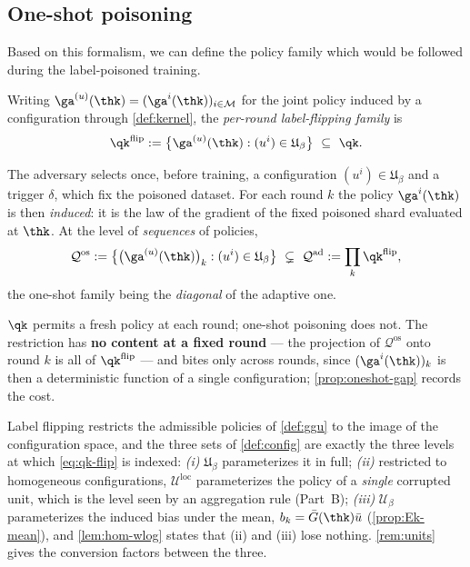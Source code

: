 \subsection{One-shot poisoning}
\label{sec:oneshot}

Based on this formalism, we can define the policy family which would be followed during the
label-poisoned training.

\begin{definition}
\label{def:qk-flip}
Writing $\ga^{(u)}(\thk)=(\ga^{i}(\thk))_{i\in\mathcal{M}}$ for the joint policy induced by a
configuration through \cref{def:kernel}, the \emph{per-round label-flipping family} is
\begin{equation}
\qk^{\mathrm{flip}}:=\big\{\ga^{(u)}(\thk):(u^i)\in\mathfrak{U}_\beta\big\}\ \subseteq\ \qk .
\label{eq:qk-flip}
\end{equation}
\end{definition}

\begin{definition}
\label{def:induced}
The adversary selects once, before training, a configuration $(u^i)\in\mathfrak{U}_\beta$ and a
trigger $\delta$, which fix the poisoned dataset. For each round $k$ the policy $\ga^i(\thk)$ is
then \emph{induced}: it is the law of the gradient of the fixed poisoned shard evaluated at
$\thk$. At the level of \emph{sequences} of policies,
\begin{equation}
\mathcal{Q}^{\mathrm{os}}:=\big\{\big(\ga^{(u)}(\thk)\big)_{k}:(u^i)\in\mathfrak{U}_\beta\big\}
\ \subsetneq\
\mathcal{Q}^{\mathrm{ad}}:=\prod_k\qk^{\mathrm{flip}} ,
\end{equation}
the one-shot family being the \emph{diagonal} of the adaptive one.
\end{definition}

$\qk$ permits a fresh policy at each round; one-shot poisoning does not. The restriction has
\textbf{no content at a fixed round} --- the projection of $\mathcal{Q}^{\mathrm{os}}$ onto round
$k$ is all of $\qk^{\mathrm{flip}}$ --- and bites only across rounds, since $(\ga^i(\thk))_k$ is
then a deterministic function of a single configuration; \cref{prop:oneshot-gap} records the
cost.

\begin{remark}
\label{rem:qk-param}
Label flipping restricts the admissible policies of \cref{def:ggu} to the image of the
configuration space, and the three sets of \cref{def:config} are exactly the three levels at
which \cref{eq:qk-flip} is indexed: \emph{(i)} $\mathfrak{U}_\beta$ parameterizes it in full;
\emph{(ii)} restricted to homogeneous configurations, $\mathcal{U}^{\mathrm{loc}}$ parameterizes
the policy of a \emph{single} corrupted unit, which is the level seen by an aggregation rule
(Part~B); \emph{(iii)} $\mathcal{U}_\beta$ parameterizes the induced bias under the mean,
$b_k=\bar G(\thk)\bar u$ (\cref{prop:Ek-mean}), and \cref{lem:hom-wlog} states that (ii) and
(iii) lose nothing. \cref{rem:units} gives the conversion factors between the three.
\end{remark}


